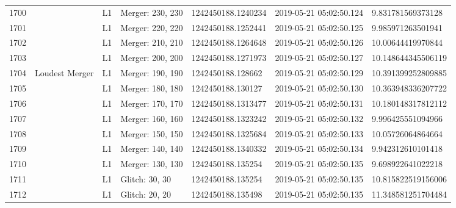 \begin{longtable}{lllllll}
1700 &                                                    &       L1 &  Merger: 230, 230 &  1242450188.1240234 &  2019-05-21 05:02:50.124 &   9.831781569373128 \\
1701 &                                                    &       L1 &  Merger: 220, 220 &  1242450188.1252441 &  2019-05-21 05:02:50.125 &   9.985971263501941 \\
1702 &                                                    &       L1 &  Merger: 210, 210 &  1242450188.1264648 &  2019-05-21 05:02:50.126 &   10.00644419970844 \\
1703 &                                                    &       L1 &  Merger: 200, 200 &  1242450188.1271973 &  2019-05-21 05:02:50.127 &  10.148644345506119 \\
1704 &                                     Loudest Merger &       L1 &  Merger: 190, 190 &   1242450188.128662 &  2019-05-21 05:02:50.129 &  10.391399252809885 \\
1705 &                                                    &       L1 &  Merger: 180, 180 &   1242450188.130127 &  2019-05-21 05:02:50.130 &  10.363948336207722 \\
1706 &                                                    &       L1 &  Merger: 170, 170 &  1242450188.1313477 &  2019-05-21 05:02:50.131 &  10.180148317812112 \\
1707 &                                                    &       L1 &  Merger: 160, 160 &  1242450188.1323242 &  2019-05-21 05:02:50.132 &   9.996425551094966 \\
1708 &                                                    &       L1 &  Merger: 150, 150 &  1242450188.1325684 &  2019-05-21 05:02:50.133 &   10.05726064864664 \\
1709 &                                                    &       L1 &  Merger: 140, 140 &  1242450188.1340332 &  2019-05-21 05:02:50.134 &   9.942312610101418 \\
1710 &                                                    &       L1 &  Merger: 130, 130 &   1242450188.135254 &  2019-05-21 05:02:50.135 &   9.698922641022218 \\
1711 &                                                    &       L1 &    Glitch: 30, 30 &   1242450188.135254 &  2019-05-21 05:02:50.135 &  10.815822519156006 \\
1712 &                                                    &       L1 &    Glitch: 20, 20 &   1242450188.135498 &  2019-05-21 05:02:50.135 &  11.348581251704484 \\

\end{longtable}
